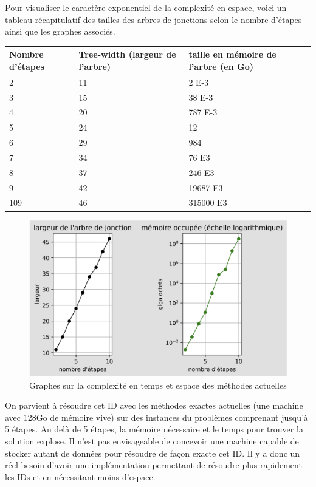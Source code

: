 \documentclass[12pt]{article}
\begin{document}
\pagebreak
Pour visualiser le caractère exponentiel de la complexité en espace, voici un tableau récapitulatif des tailles des arbres de jonctions selon le nombre d'étapes ainsi que les graphes associés.
\bigbreak
\begin{center}
   \begin{tabular}{|p{3cm} || p{3cm} | p{3cm} | }
    \hline
    Nombre d'étapes & Tree-width (largeur de l'arbre) & taille en mémoire de l'arbre (en Go) \\ 
    \hline
    2&11&2 E-3\\
    \hline
    3&15&38 E-3\\
    \hline
    4&20&787 E-3\\
    \hline
    5&24&12\\
    \hline
    6&29&984\\
    \hline
    7&34&76 E3\\
    \hline
    8&37&246 E3\\
    \hline
    9&42&19687 E3\\
    \hline
    109&46&315000 E3\\
    \hline
   \end{tabular}
\end{center}
 \begin{figure}[h]
\centering
\includegraphics[scale=0.2]{docs/ressources_rapport/graphes.png}
\caption{Graphes sur la complexité en temps et espace des méthodes actuelles}
\end{figure}

On parvient à résoudre cet ID avec les méthodes exactes actuelles (une machine avec 128Go de mémoire vive) sur des instances du problèmes comprenant jusqu'à 5 étapes. Au delà de 5 étapes, la mémoire nécessaire et le temps pour trouver la solution explose. \bigbreak
Il n'est pas envisageable de concevoir une machine capable de stocker autant de données pour résoudre de façon exacte cet ID. Il y a donc un réel besoin d'avoir une implémentation permettant de résoudre plus rapidement les IDs et en nécessitant moins d'espace.
\bigbreak
\bigbreak
\end{document}

